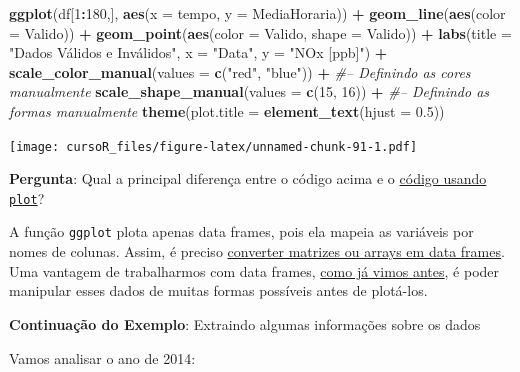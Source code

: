 \documentclass[]{book}
\newenvironment{Shaded}{\begin{snugshade}}{\end{snugshade}}
\newcommand{\KeywordTok}[1]{\textcolor[rgb]{0.13,0.29,0.53}{\textbf{#1}}}
\newcommand{\DataTypeTok}[1]{\textcolor[rgb]{0.13,0.29,0.53}{#1}}
\newcommand{\DecValTok}[1]{\textcolor[rgb]{0.00,0.00,0.81}{#1}}
\newcommand{\FloatTok}[1]{\textcolor[rgb]{0.00,0.00,0.81}{#1}}
\newcommand{\StringTok}[1]{\textcolor[rgb]{0.31,0.60,0.02}{#1}}
\newcommand{\CommentTok}[1]{\textcolor[rgb]{0.56,0.35,0.01}{\textit{#1}}}
\newcommand{\OperatorTok}[1]{\textcolor[rgb]{0.81,0.36,0.00}{\textbf{#1}}}
\newcommand{\NormalTok}[1]{#1}
\theoremstyle{definition}
\theoremstyle{definition}
\theoremstyle{definition}
\theoremstyle{remark}
\begin{document}
\begin{Shaded}
\begin{Highlighting}[]
\KeywordTok{ggplot}\NormalTok{(df[}\DecValTok{1}\OperatorTok{:}\DecValTok{180}\NormalTok{,], }\KeywordTok{aes}\NormalTok{(}\DataTypeTok{x =}\NormalTok{ tempo, }\DataTypeTok{y =}\NormalTok{ MediaHoraria)) }\OperatorTok{+}\StringTok{ }
\StringTok{  }\KeywordTok{geom_line}\NormalTok{(}\KeywordTok{aes}\NormalTok{(}\DataTypeTok{color =}\NormalTok{ Valido)) }\OperatorTok{+}
\StringTok{  }\KeywordTok{geom_point}\NormalTok{(}\KeywordTok{aes}\NormalTok{(}\DataTypeTok{color =}\NormalTok{ Valido, }\DataTypeTok{shape =}\NormalTok{ Valido)) }\OperatorTok{+}
\StringTok{  }\KeywordTok{labs}\NormalTok{(}\DataTypeTok{title =} \StringTok{"Dados Válidos e Inválidos"}\NormalTok{, }\DataTypeTok{x =} \StringTok{"Data"}\NormalTok{, }\DataTypeTok{y =} \StringTok{"NOx [ppb]"}\NormalTok{) }\OperatorTok{+}
\StringTok{  }\KeywordTok{scale_color_manual}\NormalTok{(}\DataTypeTok{values =} \KeywordTok{c}\NormalTok{(}\StringTok{"red"}\NormalTok{, }\StringTok{"blue"}\NormalTok{)) }\OperatorTok{+}\StringTok{ }\CommentTok{#-- Definindo as cores manualmente}
\StringTok{  }\KeywordTok{scale_shape_manual}\NormalTok{(}\DataTypeTok{values =} \KeywordTok{c}\NormalTok{(}\DecValTok{15}\NormalTok{, }\DecValTok{16}\NormalTok{)) }\OperatorTok{+}\StringTok{ }\CommentTok{#-- Definindo as formas manualmente}
\StringTok{  }\KeywordTok{theme}\NormalTok{(}\DataTypeTok{plot.title =} \KeywordTok{element_text}\NormalTok{(}\DataTypeTok{hjust =} \FloatTok{0.5}\NormalTok{))}
\end{Highlighting}
\end{Shaded}

\texttt{[image: cursoR\_files/figure-latex/unnamed-chunk-91-1.pdf]}

{\textbf{Pergunta}: Qual a principal diferença entre o código acima e o
\protect\hyperlink{plot_base}{código usando \texttt{plot}}?}

A função \texttt{ggplot} plota apenas data frames, pois ela mapeia as
variáveis por nomes de colunas. Assim, é preciso
\protect\hyperlink{convert_df}{converter matrizes ou arrays em data
frames}.\\
Uma vantagem de trabalharmos com data frames,
\protect\hyperlink{processing_dfs}{como já vimos antes}, é poder
manipular esses dados de muitas formas possíveis antes de plotá-los.

\textbf{Continuação do Exemplo}: Extraindo algumas informações sobre os
dados

Vamos analisar o ano de 2014:
\end{document}
